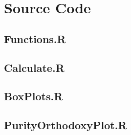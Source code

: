 \chapter{Source Code}

\section{Functions.R}


\section{Calculate.R}


\section{BoxPlots.R}


\section{PurityOrthodoxyPlot.R}

